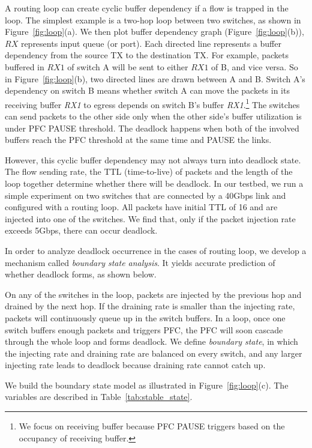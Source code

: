 A routing loop can create cyclic buffer dependency if a flow is trapped in the loop.
The simplest example is a two-hop loop between two switches, as shown in Figure~\ref{fig:loop}(a).
We then plot buffer dependency graph (Figure~\ref{fig:loop}(b)), $RX$ represents input 
queue (or port). Each directed line represents a buffer dependency from the source TX to the 
destination TX. For example, packets buffered in $RX1$ of switch A will be sent to either $RX1$ 
of B, and vice versa. So in Figure~\ref{fig:loop}(b), two directed lines are drawn between A and B.
Switch A's dependency on switch B means whether switch A can move
the packets in its receiving buffer {\em RX1} to egress depends on switch B's buffer {\em RX1}.\footnote{We 
focus on receiving buffer because PFC PAUSE triggers based on the occupancy of receiving buffer.}
The switches can send packets to the other side only 
when the other side's buffer utilization is under PFC PAUSE threshold. The deadlock happens when
both of the involved buffers reach the PFC threshold at the same time and PAUSE the links.  


However, this cyclic buffer dependency may not always turn into deadlock state. The flow
sending rate, the TTL (time-to-live) of packets and the length of the loop together 
determine whether there will be deadlock. In our testbed, we run a simple experiment on 
two switches that are connected by a 40Gbps link and configured with a routing loop. 
All packets have initial TTL of 16 and are injected into one of the switches. We find that, 
only if the packet injection rate exceeds 5Gbps, there can occur deadlock. 

In order to analyze deadlock occurrence in the cases of routing loop, we develop a mechanism called 
{\em boundary state analysis}. It yields accurate prediction of whether deadlock forms,
as shown below.

On any of the switches in the loop, packets are injected by the previous hop and drained by the next hop. 
If the draining rate is smaller than the injecting rate, packets will continuously queue up in the
switch buffers. In a loop, once one switch buffers enough packets and triggers PFC, the PFC will soon
cascade through the whole loop and forms deadlock. 
We define {\em boundary state}, in which the injecting rate and draining rate are balanced on every
switch, and any larger injecting rate leads to deadlock because draining rate cannot catch up.

We build the boundary state model as illustrated in 
Figure~\ref{fig:loop}(c). The variables are described in Table~\ref{tab:stable_state}.


